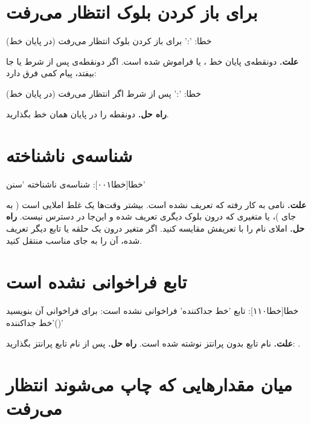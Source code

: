 \section*{ برای باز کردن بلوک انتظار می‌رفت}

\begin{progoutfa}
خطا: ':' برای باز کردن بلوک انتظار می‌رفت (در پایان خط)
\end{progoutfa}

\textbf{علت.} دونقطه‌ی پایان خط ،  یا 
فراموش شده است. اگر دونقطه‌ی پس از شرط  یا  جا بیفتد،
پیام کمی فرق دارد:

\begin{progoutfa}
خطا: ':' پس از شرط اگر انتظار می‌رفت (در پایان خط)
\end{progoutfa}

\textbf{راه حل.} دونقطه را در پایان همان خط بگذارید.

\section*{شناسه‌ی ناشناخته}

\begin{progoutfa}
خطا[خطا۰۰۱]: شناسه‌ی ناشناخته 'سنن'
\end{progoutfa}

\textbf{علت.} نامی به کار رفته که تعریف نشده است. بیشتر وقت‌ها یک غلط
املایی است ( به جای )، یا متغیری که درون بلوک
دیگری تعریف شده و این‌جا در دسترس نیست.
\textbf{راه حل.} املای نام را با تعریفش مقایسه کنید. اگر متغیر درون یک
حلقه یا تابع دیگر تعریف شده، آن را به جای مناسب منتقل کنید.

\section*{تابع فراخوانی نشده است}

\begin{progoutfa}
خطا[خطا۱۱۰]: تابع 'خط جداکننده' فراخوانی نشده است: برای فراخوانی آن بنویسید 'خط جداکننده()'
\end{progoutfa}

\textbf{علت.} نام تابع بدون پرانتز نوشته شده است.
\textbf{راه حل.} پس از نام تابع پرانتز بگذارید: \mbox{}.

\section*{میان مقدارهایی که چاپ می‌شوند  انتظار می‌رفت}

